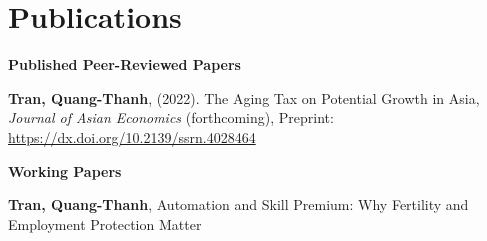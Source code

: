 
\section{\sc Publications}
{\bf Published Peer-Reviewed Papers}
\vspace*{.05in}
\begin{etaremune}[]
\item
  {\bf Tran, Quang-Thanh},
  (2022).
  {The Aging Tax on Potential Growth in Asia},
  {\it Journal of Asian Economics} (forthcoming),
  {Preprint: \url{https://dx.doi.org/10.2139/ssrn.4028464}}
\end{etaremune}

\vspace{-1em}


{\bf Working Papers}
\vspace*{.05in}
\begin{etaremune}[]
\item
  {\bf Tran, Quang-Thanh},
  {Automation and Skill Premium: Why Fertility and Employment Protection Matter}
\end{etaremune}

\vspace{-1em}


